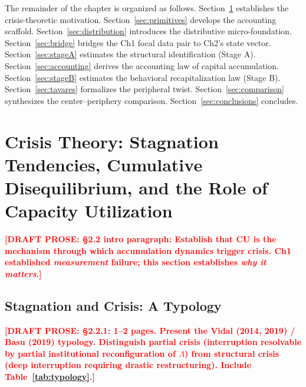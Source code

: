 \documentclass[12pt,letterpaper]{article}
\newcommand{\draftnote}[1]{%
  \textcolor{red}{\textbf{[DRAFT PROSE: #1]}}}
\begin{document}
The remainder of the chapter is organized as follows.
Section~\ref{sec:crisis} establishes the crisis-theoretic motivation.
Section~\ref{sec:primitives} develops the accounting scaffold.
Section~\ref{sec:distribution} introduces the distributive micro-foundation.
Section~\ref{sec:bridge} bridges the Ch1 focal data pair to Ch2's state vector.
Section~\ref{sec:stageA} estimates the structural identification (Stage A).
Section~\ref{sec:accounting} derives the accounting law of capital accumulation.
Section~\ref{sec:stageB} estimates the behavioral recapitalization law (Stage B).
Section~\ref{sec:tavares} formalizes the peripheral twist.
Section~\ref{sec:comparison} synthesizes the center--periphery comparison.
Section~\ref{sec:conclusions} concludes.


\section{Crisis Theory: Stagnation Tendencies, Cumulative Disequilibrium,
  and the Role of Capacity Utilization}
\label{sec:crisis}

\draftnote{§2.2 intro paragraph: Establish that CU is the mechanism through
  which accumulation dynamics trigger crisis. Ch1 established
  \emph{measurement} failure; this section establishes \emph{why it matters}.}


\subsection{Stagnation and Crisis: A Typology}
\label{sec:crisis_typology}

\draftnote{§2.2.1: 1--2 pages. Present the Vidal (2014, 2019) / Basu (2019)
  typology. Distinguish partial crisis (interruption resolvable by partial
  institutional reconfiguration of $\Lambda$) from structural crisis (deep
  interruption requiring drastic restructuring). Include Table~\ref{tab:typology}.}
\end{document}
